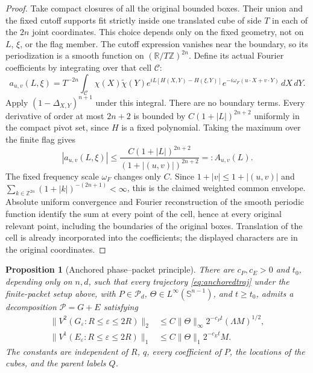\documentclass[11pt]{article}
\numberwithin{equation}{section}
\newtheorem{proposition}[theorem]{Proposition}
\theoremstyle{remark}
\theoremstyle{definition}
\newcommand{\R}{\mathbb R}
\newcommand{\Sph}{\mathbb S}
\newcommand{\norm}[1]{\lVert #1\rVert}
\begin{document}
\begin{proof}
Take compact closures of all the original bounded boxes.  Their union
and the fixed cutoff supports fit strictly inside one translated cube
of side $T$ in each of the $2n$ joint coordinates.  This choice depends
only on the fixed geometry, not on $L$, $\xi$, or the flag member.
The cutoff expression vanishes near the boundary, so its periodization
is a smooth function on $(\R/T\mathbb Z)^{2n}$.  Define its actual
Fourier coefficients by integrating over that cell $\mathcal C$:
\[
 a_{u,v}(L,\xi)=T^{-2n}\int_{\mathcal C}
 \chi(X)\widetilde\chi(Y)e^{iL[H(X,Y)-H(\xi,Y)]}
 e^{-i\omega_F(u\cdot X+v\cdot Y)}\,dX\,dY.
\]
Apply $(1-\Delta_{X,Y})^{n+1}$ under this integral.  There are no
boundary terms.  Every derivative of order at most $2n+2$ is bounded
by $C(1+|L|)^{2n+2}$ uniformly in the compact pivot set, since $H$ is a
fixed polynomial.  Taking the maximum over the finite flag gives
\[
 |a_{u,v}(L,\xi)|\le
 \frac{C(1+|L|)^{2n+2}}{(1+|(u,v)|)^{2n+2}}
 =:A_{u,v}(L).
\]
The fixed frequency scale $\omega_F$ changes only $C$.  Since
$1+|v|\le1+|(u,v)|$ and
$\sum_{k\in\mathbb Z^{2n}}(1+|k|)^{-(2n+1)}<\infty$, this is the
claimed weighted common envelope.  Absolute uniform convergence and
Fourier reconstruction of the smooth periodic function identify the sum
at every point of the cell, hence at every original relevant point,
including the boundaries of the original boxes.  Translation of the
cell is already incorporated into the coefficients; the displayed
characters are in the original coordinates.
\end{proof}

\begin{proposition}[Anchored phase--packet principle]\label{prop:anchoredpacket}
There are $c_P,c_E>0$ and $t_0$, depending only on $n,d$, such that every
trajectory \eqref{eq:anchoredtraj} under the finite-packet setup above,
with $P\in\mathcal P_d$, $\Theta\in L^\infty(\Sph^{n-1})$, and
$t\ge t_0$, admits a decomposition
$\mathcal P=G+E$ satisfying
\begin{align}
 \norm{V^2(G_\varepsilon:R\le\varepsilon\le2R)}_2
 &\le C\norm\Theta_\infty 2^{-c_Pt}(\Lambda M)^{1/2},
 \label{eq:anchoredG}\\
 \norm{V^1(E_\varepsilon:R\le\varepsilon\le2R)}_1
 &\le C\norm\Theta_1 2^{-c_Et}M.
 \label{eq:anchoredE}
\end{align}
The constants are independent of $R$, $q$, every coefficient of $P$, the
locations of the cubes, and the parent labels $Q$.
\end{proposition}
\end{document}

